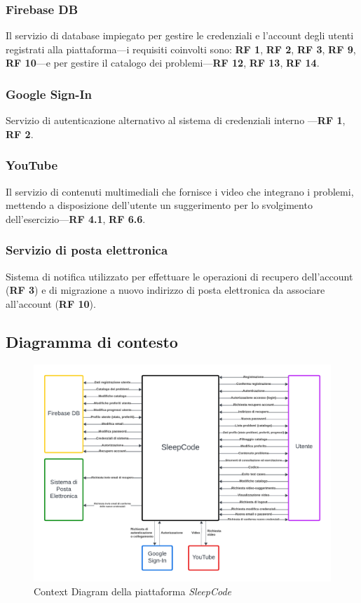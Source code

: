 \documentclass[11pt, a4paper]{article}
\theoremstyle{definition} %
\begin{document}
\subsubsection{Firebase DB}
Il servizio di database impiegato per gestire le credenziali e l'account
degli utenti registrati alla piattaforma—i requisiti coinvolti sono: \textbf{RF 1},
\textbf{RF 2}, \textbf{RF 3}, \textbf{RF 9}, \textbf{RF 10}—e per gestire il
catalogo dei problemi—\textbf{RF 12}, \textbf{RF 13}, \textbf{RF 14}.

\subsubsection{Google Sign-In}
Servizio di autenticazione alternativo al sistema di credenziali interno
—\textbf{RF 1}, \textbf{RF 2}.

\subsubsection{YouTube}
Il servizio di contenuti multimediali che fornisce i video che integrano
i problemi, mettendo a disposizione dell'utente un suggerimento per lo
svolgimento dell'esercizio—\textbf{RF 4.1}, \textbf{RF 6.6}.

\subsubsection{Servizio di posta elettronica}
Sistema di notifica utilizzato per effettuare le operazioni di recupero
dell'account (\textbf{RF 3}) e di migrazione a nuovo indirizzo di posta
elettronica da associare all'account (\textbf{RF 10}).

\subsection{Diagramma di contesto} %
\begin{figure}[H]
\centering
\hspace*{-1.8cm}
\includegraphics[scale=0.6]{materiale/contextdiagram.pdf}
\caption{Context Diagram della piattaforma \textit{SleepCode}}
\label{contextdiagram}
\end{figure}
\end{document}
